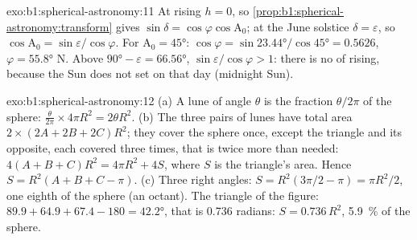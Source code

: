 \begin{solution}{exo:b1:spherical-astronomy:11}
At rising $h = 0$, so \cref{prop:b1:spherical-astronomy:transform} gives
$\sin\delta = \cos\varphi\cos\mathrm{A}_0$; at the June solstice
$\delta = \varepsilon$, so $\cos\mathrm{A}_0 = \sin\varepsilon/\cos\varphi$.
For $\mathrm{A}_0 = \ang{45}$: $\cos\varphi = \sin\ang{23.44}/\cos\ang{45} =
0.5626$, $\varphi = \ang{55.8}$ N. Above $\ang{90} - \varepsilon =
\ang{66.56}$, $\sin\varepsilon/\cos\varphi > 1$: there is no  of
rising, because the Sun does not set on that day (midnight Sun).
\end{solution}

\begin{solution}{exo:b1:spherical-astronomy:12}
(a) A lune of angle $\theta$ is the fraction $\theta/2\pi$ of the sphere:
$\frac{\theta}{2\pi}\times4\pi R^2 = 2\theta R^2$. (b) The three pairs of
lunes have total area $2\times(2A + 2B + 2C)R^2$; they cover the sphere once,
except the triangle and its opposite, each covered three times, that is
twice more than needed: $4(A + B + C)R^2 = 4\pi R^2 + 4S$, where $S$ is the
triangle's area. Hence $S = R^2(A + B + C - \pi)$. (c) Three right angles:
$S = R^2(3\pi/2 - \pi) = \pi R^2/2$, one eighth of the sphere (an octant).
The triangle of the figure: $89.9 + 64.9 + 67.4 - 180 = \ang{42.2}$, that is
\num{0.736} radians: $S = 0.736\,R^2$, \qty{5.9}{\percent} of the sphere.
\end{solution}

